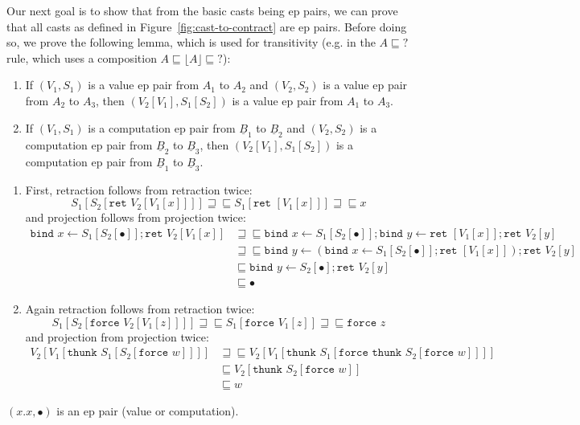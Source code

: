 \documentclass[acmsmall,nonacm]{acmart}
\renewcommand{\u}{\underline}
\newcommand{\floor}[1]{\lfloor#1\rfloor}
\newcommand{\ltdyn}{\sqsubseteq}
\newcommand{\gtdyn}{\sqsupseteq}
\newcommand{\equidyn}{\mathrel{\gtdyn\ltdyn}}
\newcommand{\dynv}{{?}}
\newcommand{\bindXtoYinZ}[2]{\kw{bind}#2 \leftarrow #1;}
\newcommand{\kw}[1]{\texttt{#1}\,\,}
\newcommand{\ret}{\kw{ret}}
\newcommand{\thunk}{\kw{thunk}}
\newcommand{\force}{\kw{force}}
\begin{document}
\begin{longonly}
Our next goal is to show that from the basic casts being ep pairs, we
can prove that all casts as defined in Figure~\ref{fig:cast-to-contract}
are ep pairs.  Before doing so, we prove the following lemma, which is
used for transitivity (e.g. in the $A \ltdyn \dynv$ rule, which uses a
composition $A \ltdyn \floor{A} \ltdyn \dynv$):
\begin{lemma}\hfill
  \label{lem:ep-pairs-compose}
  \begin{enumerate}
  \item If $(V_1, S_1)$ is a value ep pair from $A_1$ to $A_2$ and
    $(V_2,S_2)$ is a value ep pair from $A_2$ to $A_3$, then
    $(V_2[V_1], S_1[S_2])$ is a value ep pair from $A_1$ to $A_3$.
  \item If $(V_1, S_1)$ is a computation ep pair from $\u B_1$ to $\u B_2$ and
    $(V_2,S_2)$ is a computation ep pair from $\u B_2$ to $\u B_3$, then
    $(V_2[V_1], S_1[S_2])$ is a computation ep pair from $\u B_1$ to $\u B_3$.
  \end{enumerate}
\end{lemma}
\begin{longproof}
  \begin{enumerate}
  \item First, retraction follows from retraction twice:
    \[ S_1[S_2[\ret V_2[V_1[x]]]] \equidyn S_1[\ret [V_1[x]]] \equidyn x \]
    and projection follows from projection twice:
    \begin{align*}
      \bindXtoYinZ {S_1[S_2[\bullet]]} x \ret V_2[V_1[x]]
      &\equidyn
      {\bindXtoYinZ {S_1[S_2[\bullet]]} x \bindXtoYinZ {\ret [V_1[x]]} y \ret V_2[y]}\tag{$\u F\beta$}\\
      &\equidyn
      \bindXtoYinZ {(\bindXtoYinZ {S_1[S_2[\bullet]]} x {\ret [V_1[x]]})} y \ret V_2[y]\tag{Commuting conversion}\\
      &\ltdyn
      \bindXtoYinZ {S_2[\bullet]} y \ret V_2[y]\tag{Projection}\\
      &\ltdyn \bullet \tag{Projection}
    \end{align*}
  \item Again retraction follows from retraction twice:
    \[ S_1[S_2[\force V_2[V_1[z]]]] \equidyn S_1[\force V_1[z]] \equidyn \force z \]
    and projection from projection twice:
    \begin{align*}
      V_2[V_1[\thunk S_1[S_2[\force w]]]]
      &\equidyn V_2[V_1[\thunk S_1[\force \thunk S_2[\force w]]]]\tag{$U\beta$}\\
      &\ltdyn V_2[\thunk S_2[\force w]] \tag{Projection}\\
      &\ltdyn w \tag{Projection}
    \end{align*}
  \end{enumerate}
\end{longproof}
\begin{longonly}
\begin{lemma}
  \label{ep-pair-id}
  $(x. x, \bullet)$ is an ep pair (value or computation).
\end{lemma}  
\end{longonly}


\end{longonly}
\end{document}
